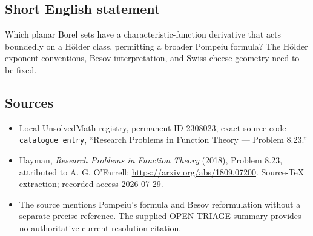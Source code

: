 \documentclass[11pt]{article}
\begin{document}
\subsection{Short English statement}
Which planar Borel sets have a characteristic-function derivative that acts boundedly on a H\"older class, permitting a broader Pompeiu formula? The Hölder exponent conventions, Besov interpretation, and Swiss-cheese geometry need to be fixed.
\subsection{Sources}
\begin{itemize}
\item Local UnsolvedMath registry, permanent ID \(2308023\), exact source code \texttt{catalogue entry}, ``Research Problems in Function Theory --- Problem 8.23.''
\item Hayman, \emph{Research Problems in Function Theory} (2018), Problem 8.23, attributed to A. G. O'Farrell; \url{https://arxiv.org/abs/1809.07200}. Source-TeX extraction; recorded access 2026-07-29.
\item The source mentions Pompeiu's formula and Besov reformulation without a separate precise reference. The supplied OPEN-TRIAGE summary provides no authoritative current-resolution citation.
\end{itemize}
\end{document}
